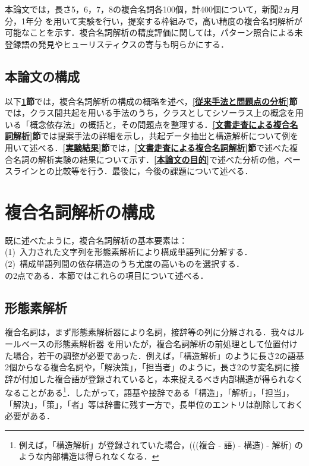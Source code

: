 本論文では，長さ5，6，7，8の複合名詞各100個，計400個について，新聞2ヵ月分，1年分\break
を用いて実験を行い，提案する枠組みで，高い精度の複合名詞解析が可能なことを示す．複合名詞解析の精度評価に関しては，パターン照合による未登録語の発見やヒューリスティクスの寄与も明らかにする．

\subsection{本論文の構成}\label{本論文の構成}
以下{\bf \ref{複合名詞解析の構成}節}では，複合名詞解析の構成の概略を述べ，{\bf \ref{従来手法と問題点の分析}節}では，クラス間共起を用いる手法のうち，クラスとしてシソーラス上の概念を用いる「概念依存法」の概括と，その問題点を整理する．{\bf \ref{文書走査による複合名詞解析}節}では提案手法の詳細を示し，共起データ抽出と構造解析について例を用いて述べる．{\bf \ref{実験結果}節}では，{\bf \ref{文書走査による複合名詞解析}節}で述べた複合名詞の解析実験の結果について示す．{\bf \ref{本論文の目的}}で述べた分析の他，ベースラインとの比較等を行う．最後に，今後の課題について述べる．

\section{複合名詞解析の構成}\label{複合名詞解析の構成}
既に述べたように，複合名詞解析の基本要素は：\\
(1)\ 入力された文字列を形態素解析により構成単語列に分解する．\\
(2)\ 構成単語列間の依存構造のうち尤度の高いものを選択する．\\
の2点である．本節ではこれらの項目について述べる．

\subsection{形態素解析}\label{形態素解析}
複合名詞は，まず形態素解析器により名詞，接辞等の列に分解される．我々はルールベースの形態素解析器 \cite{久光1994}を用いたが，複合名詞解析の前処理として位置付けた場合，若干の調整が必要であった．例えば，「構造解析」のように長さ2の語基2個からなる複合名詞や，「解決策」，「担当者」のように，長さ2のサ変名詞に接辞が付加した複合語が登録されていると，本来捉えるべき内部構造が得られなくなることがある\footnote{例えば，「構造解析」が登録されていた場合，(((複合 - 語) - 構造) - 解析) のような内部構造は得られなくなる．}．したがって，語基や接辞である「構造」，「解析」，「担当」，「解決」，「策」，「者」等は辞書に残す一方で，長単位のエントリは削除しておく必要がある．

